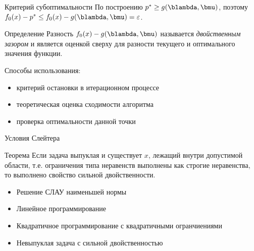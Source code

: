 \documentclass[12pt]{beamer}
\begin{document}
\begin{frame}{Критерий субоптимальности}
По построению $p^* \geq g(\blambda, \bmu)$, поэтому $f_0(x) - p^* \leq f_0(x) - g(\blambda, \bmu) = \varepsilon$.
\begin{block}{Определение}
Разность $f_0(x) - g(\blambda, \bmu)$ называется \emph{двойственным зазором} и является оценкой сверху для разности текущего и оптимального значения функции.
\end{block}
Способы использования:
\begin{itemize}
\item критерий остановки в итерационном процессе
\item теоретическая оценка сходимости алгоритма
\item проверка оптимальности данной точки
\end{itemize}
\end{frame}

\begin{frame}{Условия Слейтера}
\begin{block}{Теорема}
Если задача выпуклая и существует $x$, лежащий внутри допустимой области, т.е. ограничения типа неравенств выполнены как строгие неравенства, то выполнено свойство сильной двойственности.
\end{block}

\begin{itemize}
\item Решение СЛАУ наименьшей нормы
\item Линейное программирование
\item Квадратичное программирование с квадратичными огранчиениями
\item Невыпуклая задача с сильной двойственностью
\end{itemize}
\end{frame}

%
\end{document}
